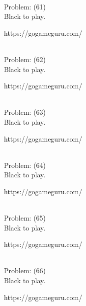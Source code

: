 \documentclass[11pt]{article}
\begin{document}
\begin{minipage}[t]{0.5\textwidth}
  {\centering
  
\\
  Problem: (61)\\
  Black to play.

https://gogameguru.com/\\
  }
\end{minipage}
\begin{minipage}[t]{0.5\textwidth}
  {\centering
  
\\
  Problem: (62)\\
  Black to play.

https://gogameguru.com/\\
  }
\end{minipage}
\begin{minipage}[t]{0.5\textwidth}
  {\centering
  
\\
  Problem: (63)\\
  Black to play.

https://gogameguru.com/\\
  }
\end{minipage}
\begin{minipage}[t]{0.5\textwidth}
  {\centering
  
\\
  Problem: (64)\\
  Black to play.

https://gogameguru.com/\\
  }
\end{minipage}
\begin{minipage}[t]{0.5\textwidth}
  {\centering
  
\\
  Problem: (65)\\
  Black to play.

https://gogameguru.com/\\
  }
\end{minipage}
\begin{minipage}[t]{0.5\textwidth}
  {\centering
  
\\
  Problem: (66)\\
  Black to play.

https://gogameguru.com/\\
  }
\end{minipage}
\end{document}
